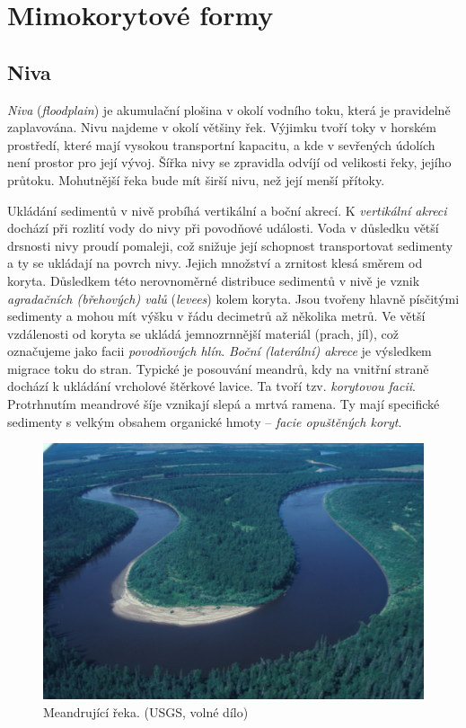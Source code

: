 \section{Mimokorytové formy}
\subsection{Niva}
\emph{Niva} (\textit{floodplain}) je akumulační plošina v okolí vodního toku, která je pravidelně zaplavována. Nivu najdeme v okolí většiny řek. Výjimku tvoří toky v horském prostředí, které mají vysokou transportní kapacitu, a kde v sevřených údolích není prostor pro její vývoj. Šířka nivy se zpravidla odvíjí od velikosti řeky, jejího průtoku. Mohutnější řeka bude mít širší nivu, než její menší přítoky. 

Ukládání sedimentů v nivě probíhá vertikální a boční akrecí. K \emph{vertikální akreci} dochází při rozlití vody do nivy při povodňové události. Voda v důsledku větší drsnosti nivy proudí pomaleji, což snižuje její schopnost transportovat sedimenty a ty se ukládají na povrch nivy. Jejich množství a zrnitost klesá směrem od koryta. Důsledkem této nerovnoměrné distribuce sedimentů v nivě je vznik \emph{agradačních (břehových) valů} (\textit{levees}) kolem koryta. Jsou tvořeny hlavně písčitými sedimenty a mohou mít výšku v řádu decimetrů až několika metrů. Ve větší vzdálenosti od koryta se ukládá jemnozrnnější materiál (prach, jíl), což označujeme jako facii \emph{povodňových hlín}. \emph{Boční (laterální) akrece} je výsledkem migrace toku do stran. Typické je posouvání meandrů, kdy na vnitřní straně dochází k ukládání vrcholové štěrkové lavice. Ta tvoří tzv. \emph{korytovou facii}. Protrhnutím meandrové šíje vznikají slepá a mrtvá ramena. Ty mají specifické sedimenty s velkým obsahem organické hmoty -- \emph{facie opuštěných koryt}.


\begin{figure}[h]
	\centering
	\includegraphics[width=1\linewidth]{obrazky/fluvial/meander}
	\caption{Meandrující řeka. (USGS, volné dílo)}
	\label{fig:meander}
\end{figure}

